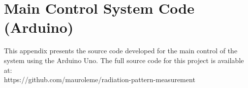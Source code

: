 \chapter{Main Control System Code
(Arduino)}
\label{apendice2}

This appendix presents the source code developed for the main control of the system
using the Arduino Uno. The full source code for this project is available at:\\ https://github.com/mauroleme/radiation-pattern-measurement


